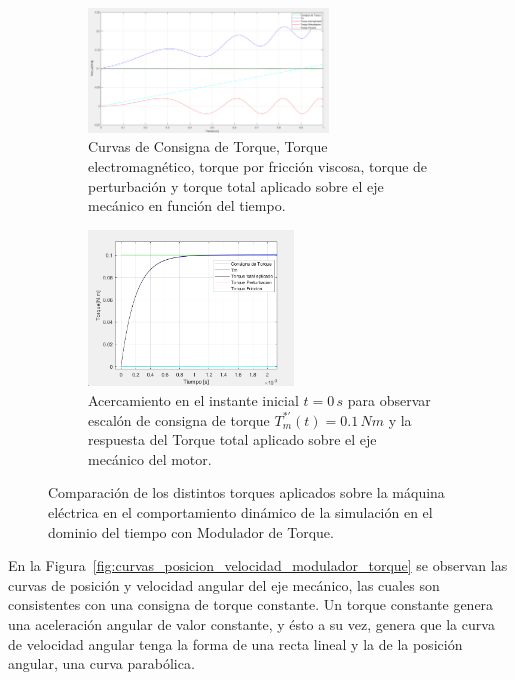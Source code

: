 \documentclass{article}
\begin{document}
\begin{figure}[H]
    \centering
    \begin{subfigure}[t]{\textwidth}
        \centering
        \includegraphics[width=0.7\textwidth]{Imagenes/Torques_simulacion_modulador_torque.png}
        \caption{Curvas de Consigna de Torque, Torque electromagnético, torque por fricción viscosa, torque de perturbación y torque total aplicado sobre el eje mecánico en función del tiempo.}
        \label{fig:curvas_torques_modulador}
    \end{subfigure}
    
    \vspace{0.5cm} %
    
    \begin{subfigure}[t]{\textwidth}
        \centering
        \includegraphics[width=0.6\textwidth]{Imagenes/Acercamiento_torques_modulador.png}
        \caption{Acercamiento en el instante inicial \(t = 0\, s\) para observar escalón de consigna de torque \(T^{*'}_m(t) = 0{.}1\, Nm\) y la respuesta del Torque total aplicado sobre el eje mecánico del motor.}
        \label{fig:acercamiento_torques_modulador}
    \end{subfigure}
    \caption{Comparación de los distintos torques aplicados sobre la máquina eléctrica en el comportamiento dinámico de la simulación en el dominio del tiempo con Modulador de Torque.}
    \label{fig:simulacionDT_modulador_torques}
\end{figure}
\newpage
En la Figura~\ref{fig:curvas_posicion_velocidad_modulador_torque} se observan las curvas de posición y velocidad angular del eje mecánico, las cuales son consistentes con una consigna de torque constante. Un torque constante genera una aceleración angular de valor constante, y ésto a su vez, genera que la curva de velocidad angular tenga la forma de una recta lineal y la de la posición angular, una curva parabólica.
\end{document}
